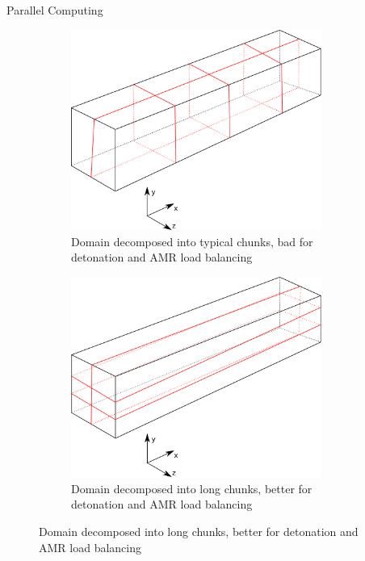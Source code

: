 \begin{frame}[allowframebreaks]{Parallel Computing}
\begin{figure}[p]
    \centering
    \begin{subfigure}[]{0.45\textwidth}
        \centering
        \includegraphics[width=0.9\textwidth]{../figs/parallel_short.png}
        \caption{Domain decomposed into typical chunks, bad for detonation and AMR load balancing}
    \end{subfigure}%
    \begin{subfigure}[]{0.45\textwidth}
        \centering
        \includegraphics[width=0.9\textwidth]{../figs/parallel_long.png}
        \caption{Domain decomposed into long chunks, better for detonation and AMR load balancing}
    \end{subfigure}
\end{figure}%
\end{frame}


